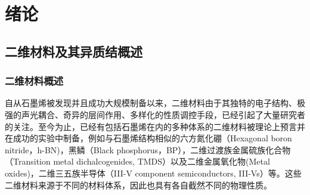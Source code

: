 \chapter{绪\hspace{6pt}论}

\section{二维材料及其异质结概述}
\subsection{二维材料概述}
自从石墨烯被发现并且成功大规模制备以来，二维材料由于其独特的电子结构、极强的声光耦合、奇异的层间作用、多样化的性质调控手段，已经引起了大量研究者的关注。至今为止，已经有包括石墨烯在内的多种体系的二维材料被理论上预言并在成功的实验中制备，例如与石墨烯结构相似的六方氮化硼（Hexagonal boron nitride，h-BN)，黑鳞（Black phosphorus，BP），二维过渡族金属硫族化合物（Transition metal dichalcogenides, TMDS）以及二维金属氧化物(Metal oxides)，二维三五族半导体（III-V component semiconductors, III-Vs）等。这些二维材料来源于不同的材料体系，因此也具有各自截然不同的物理性质。%

